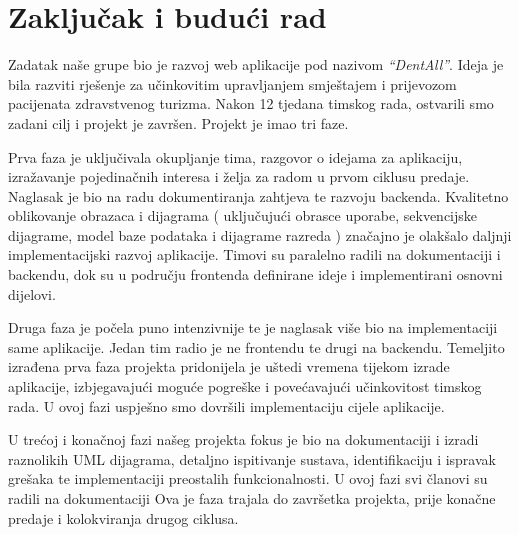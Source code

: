 \chapter{Zaključak i budući rad}
		
		 Zadatak naše grupe bio je razvoj web aplikacije pod nazivom \textit{ “DentAll”}. Ideja je bila razviti rješenje za učinkovitim upravljanjem smještajem i prijevozom pacijenata zdravstvenog turizma. Nakon 12 tjedana timskog rada, ostvarili smo zadani cilj i projekt je završen. Projekt je imao tri faze.
		 
		 Prva faza je uključivala okupljanje tima, razgovor o idejama za aplikaciju, izražavanje pojedinačnih interesa i želja za radom u prvom ciklusu predaje.
		 Naglasak je bio na radu dokumentiranja zahtjeva te razvoju backenda. Kvalitetno oblikovanje obrazaca i dijagrama ( uključujući obrasce uporabe, sekvencijske dijagrame, model baze podataka i dijagrame razreda ) značajno je olakšalo daljnji implementacijski razvoj aplikacije. Timovi su paralelno radili na dokumentaciji i backendu, dok su u području frontenda definirane ideje i implementirani osnovni dijelovi.
		 
		 Druga faza je počela puno intenzivnije te je naglasak više bio na implementaciji same aplikacije. Jedan tim radio je ne frontendu te drugi na backendu. Temeljito izrađena prva faza projekta pridonijela je uštedi vremena tijekom izrade aplikacije, izbjegavajući moguće pogreške i povećavajući učinkovitost timskog rada. U ovoj fazi uspješno smo dovršili implementaciju cijele aplikacije.
		 
		 U trećoj i konačnoj fazi našeg projekta fokus je bio na dokumentaciji i izradi raznolikih UML dijagrama, detaljno ispitivanje sustava, identifikaciju i ispravak grešaka te implementaciji preostalih funkcionalnosti. U ovoj fazi svi članovi su radili na dokumentaciji Ova je faza trajala do završetka projekta, prije konačne predaje i kolokviranja drugog ciklusa.
		 
		 
		
		\eject 